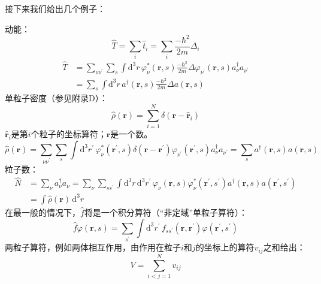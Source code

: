 接下来我们给出几个例子：

动能：
\begin{equation}
\hat{T}=\sum_{i}\hat{t}_{i}=\sum_{i}\frac{-\hbar^{2}}{2m}\Delta_{i}\label{eq:appendix_c_kinetic_sum}
\end{equation}
\begin{align}
\hat{T} & =\sum_{\nu\nu^{\prime}}\sum_{s}\int\mathrm{d}^{3}r\,\varphi^{*}_{\nu}(\boldsymbol{r},s)\frac{-\hbar^{2}}{2m}\Delta\varphi_{\nu^{\prime}}(\boldsymbol{r},s)a^{\dagger}_{\nu}a_{\nu^{\prime}}\nonumber \\
 & =\sum_{s}\int\mathrm{d}^{3}r\,a^{\dagger}(\boldsymbol{r},s)\frac{-\hbar^{2}}{2m}\Delta a(\boldsymbol{r},s)\label{eq:appendix_c_kinetic_field}
\end{align}
单粒子密度（参见附录D）：
\begin{equation}
\hat{\rho}(\boldsymbol{r})=\sum^{N}_{i=1}\delta(\boldsymbol{r}-\hat{\boldsymbol{r}}_{i})\label{eq:appendix_c_density_op}
\end{equation}
$\hat{\boldsymbol{r}}_{i}$是第$i$个粒子的坐标算符；$\boldsymbol{r}$是一个数。
\begin{equation}
\hat{\rho}(\boldsymbol{r})=\sum_{\nu\nu^{\prime}}\sum_{s}\int\mathrm{d}^{3}r^{\prime}\,\varphi^{*}_{\nu}(\boldsymbol{r}^{\prime},s)\delta(\boldsymbol{r}-\boldsymbol{r}^{\prime})\varphi_{\nu^{\prime}}(\boldsymbol{r}^{\prime},s)a^{\dagger}_{\nu}a_{\nu^{\prime}}=\sum_{s}a^{\dagger}(\boldsymbol{r},s)a(\boldsymbol{r},s)\label{eq:appendix_c_density_field}
\end{equation}
粒子数：
\begin{align}
\hat{N} & =\sum_{\nu}a^{\dagger}_{\nu}a_{\nu}=\sum_{\nu}\sum_{ss^{\prime}}\int\mathrm{d}^{3}r\,\mathrm{d}^{3}r^{\prime}\,\varphi_{\nu}(\boldsymbol{r},s)\varphi^{*}_{\nu}(\boldsymbol{r}^{\prime},s^{\prime})a^{\dagger}(\boldsymbol{r},s)a(\boldsymbol{r}^{\prime},s^{\prime})\nonumber \\
 & =\int\hat{\rho}(\boldsymbol{r})\,\mathrm{d}^{3}r\label{eq:appendix_c_number_op}
\end{align}
在最一般的情况下，$\hat{f}$将是一个积分算符（“非定域”单粒子算符）：
\begin{equation}
\hat{f}\varphi(\boldsymbol{r},s)=\sum_{s^{\prime}}\int\mathrm{d}^{3}r^{\prime}\,f_{ss^{\prime}}(\boldsymbol{r},\boldsymbol{r}^{\prime})\varphi(\boldsymbol{r}^{\prime},s^{\prime})\label{eq:appendix_c_nonlocal_f}
\end{equation}
两粒子算符，例如两体相互作用，由作用在粒子$i$和$j$的坐标上的算符$v_{ij}$之和给出：
\begin{equation}
V=\sum^{N}_{i<j=1}v_{ij}\label{eq:appendix_c_two_body_sum}
\end{equation}
